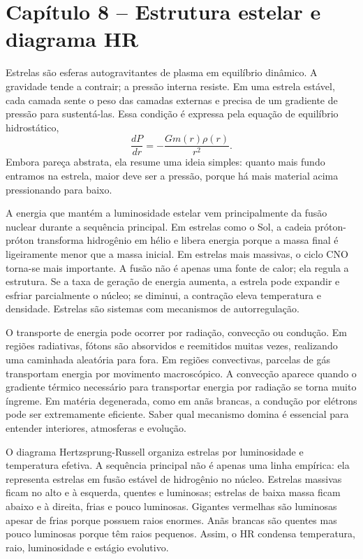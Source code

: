 \documentclass[11pt,a4paper]{article}
\begin{document}
\newpage
\section*{Capítulo 8 -- Estrutura estelar e diagrama HR}
Estrelas são esferas autogravitantes de plasma em equilíbrio dinâmico. A gravidade tende a contrair; a pressão interna resiste. Em uma estrela estável, cada camada sente o peso das camadas externas e precisa de um gradiente de pressão para sustentá-las. Essa condição é expressa pela equação de equilíbrio hidrostático,
\[
\frac{dP}{dr}=-\frac{Gm(r)\rho(r)}{r^2}.
\]
Embora pareça abstrata, ela resume uma ideia simples: quanto mais fundo entramos na estrela, maior deve ser a pressão, porque há mais material acima pressionando para baixo.

A energia que mantém a luminosidade estelar vem principalmente da fusão nuclear durante a sequência principal. Em estrelas como o Sol, a cadeia próton-próton transforma hidrogênio em hélio e libera energia porque a massa final é ligeiramente menor que a massa inicial. Em estrelas mais massivas, o ciclo CNO torna-se mais importante. A fusão não é apenas uma fonte de calor; ela regula a estrutura. Se a taxa de geração de energia aumenta, a estrela pode expandir e esfriar parcialmente o núcleo; se diminui, a contração eleva temperatura e densidade. Estrelas são sistemas com mecanismos de autorregulação.

O transporte de energia pode ocorrer por radiação, convecção ou condução. Em regiões radiativas, fótons são absorvidos e reemitidos muitas vezes, realizando uma caminhada aleatória para fora. Em regiões convectivas, parcelas de gás transportam energia por movimento macroscópico. A convecção aparece quando o gradiente térmico necessário para transportar energia por radiação se torna muito íngreme. Em matéria degenerada, como em anãs brancas, a condução por elétrons pode ser extremamente eficiente. Saber qual mecanismo domina é essencial para entender interiores, atmosferas e evolução.

O diagrama Hertzsprung-Russell organiza estrelas por luminosidade e temperatura efetiva. A sequência principal não é apenas uma linha empírica: ela representa estrelas em fusão estável de hidrogênio no núcleo. Estrelas massivas ficam no alto e à esquerda, quentes e luminosas; estrelas de baixa massa ficam abaixo e à direita, frias e pouco luminosas. Gigantes vermelhas são luminosas apesar de frias porque possuem raios enormes. Anãs brancas são quentes mas pouco luminosas porque têm raios pequenos. Assim, o HR condensa temperatura, raio, luminosidade e estágio evolutivo.
\end{document}
